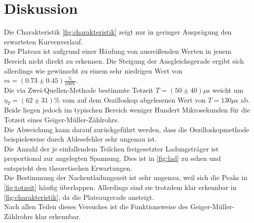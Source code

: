 \section{Diskussion}
\label{sec:Diskussion}

Die Charakteristik \autoref{fig:charakteristik} zeigt nur in geringer Ausprägung den erwarteten 
Kurvenverlauf.\\
Das Plateau ist aufgrund einer Häufung von ausreißenden Werten in jenem Bereich
nicht direkt zu erkennen. Die Steigung der Ausgleichsgerade ergibt sich allerdings wie gewünscht zu einem 
sehr niedrigen Wert von $m = (0.73 \pm 0.45) \mathrm{\frac{\%}{100 V}}$.\\
Die via Zwei-Quellen-Methode bestimmte Totzeit $T = (50 \pm 40) \mu$s weicht um 
$\eta_T = (62 \pm 31) \% $ vom auf dem Oszilloskop abgelesenen Wert von $T = 130 \mu$s 
ab. 
Beide liegen jedoch im typischen Bereich weniger Hundert Mikrosekunden für die Totzeit eines Geiger-Müller-Zählrohrs.\\
Die Abweichung kann darauf zurückgeführt werden, dass die Oszilloskopmethode
beispielsweise durch Ablesefehler sehr ungenau ist.\\
Die Anzahl der je einfallendem Teilchen freigesetzter Ladungsträger 
ist proportional zur angelegten Spannung. Dies ist in \autoref{fig:lad} zu sehen und entspricht den theoretischen Erwartungen.\\
Die Bestimmung der Nachentladungszeit ist sehr ungenau, weil sich die Peaks in \autoref{fig:totzeit} häufig überlappen. Allerdings sind sie trotzdem klar erkennbar in \autoref{fig:charakteristik}, da die Plateaugerade ansteigt.\\
Nach allen Teilen dieses Versuches ist die Funktionsweise des Geiger-Müller-Zählrohrs klar erkennbar.
